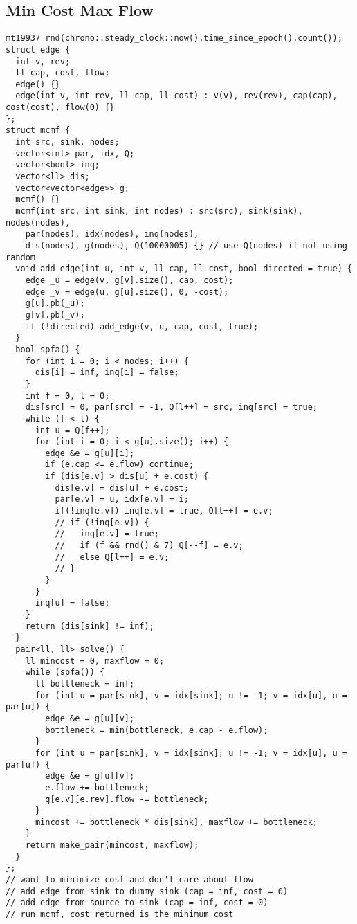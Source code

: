 \documentclass[10pt,a4paper,onesided]{article}
\begin{document}
\begin{multicols*}{3}
\subsection{Min Cost Max Flow}
\begin{lstlisting}
mt19937 rnd(chrono::steady_clock::now().time_since_epoch().count());
struct edge {
  int v, rev;
  ll cap, cost, flow;
  edge() {}
  edge(int v, int rev, ll cap, ll cost) : v(v), rev(rev), cap(cap), cost(cost), flow(0) {}
};
struct mcmf {
  int src, sink, nodes;
  vector<int> par, idx, Q;
  vector<bool> inq;
  vector<ll> dis;
  vector<vector<edge>> g;
  mcmf() {}
  mcmf(int src, int sink, int nodes) : src(src), sink(sink), nodes(nodes),
    par(nodes), idx(nodes), inq(nodes),
    dis(nodes), g(nodes), Q(10000005) {} // use Q(nodes) if not using random
  void add_edge(int u, int v, ll cap, ll cost, bool directed = true) {
    edge _u = edge(v, g[v].size(), cap, cost);
    edge _v = edge(u, g[u].size(), 0, -cost);
    g[u].pb(_u);
    g[v].pb(_v);
    if (!directed) add_edge(v, u, cap, cost, true);
  }
  bool spfa() {
    for (int i = 0; i < nodes; i++) {
      dis[i] = inf, inq[i] = false;
    }
    int f = 0, l = 0;
    dis[src] = 0, par[src] = -1, Q[l++] = src, inq[src] = true;
    while (f < l) {
      int u = Q[f++];
      for (int i = 0; i < g[u].size(); i++) {
        edge &e = g[u][i];
        if (e.cap <= e.flow) continue;
        if (dis[e.v] > dis[u] + e.cost) {
          dis[e.v] = dis[u] + e.cost;
          par[e.v] = u, idx[e.v] = i;
          if(!inq[e.v]) inq[e.v] = true, Q[l++] = e.v;
          // if (!inq[e.v]) {
          //   inq[e.v] = true;
          //   if (f && rnd() & 7) Q[--f] = e.v;
          //   else Q[l++] = e.v;
          // }
        }
      }
      inq[u] = false;
    }
    return (dis[sink] != inf);
  }
  pair<ll, ll> solve() {
    ll mincost = 0, maxflow = 0;
    while (spfa()) {
      ll bottleneck = inf;
      for (int u = par[sink], v = idx[sink]; u != -1; v = idx[u], u = par[u]) {
        edge &e = g[u][v];
        bottleneck = min(bottleneck, e.cap - e.flow);
      }
      for (int u = par[sink], v = idx[sink]; u != -1; v = idx[u], u = par[u]) {
        edge &e = g[u][v];
        e.flow += bottleneck;
        g[e.v][e.rev].flow -= bottleneck;
      }
      mincost += bottleneck * dis[sink], maxflow += bottleneck;
    }
    return make_pair(mincost, maxflow);
  }
}; 
// want to minimize cost and don't care about flow
// add edge from sink to dummy sink (cap = inf, cost = 0)
// add edge from source to sink (cap = inf, cost = 0)
// run mcmf, cost returned is the minimum cost
\end{lstlisting}

\end{multicols*}
\end{document}
